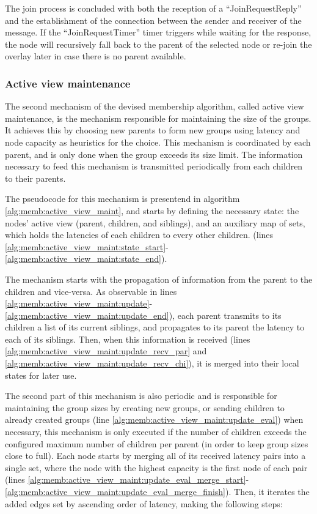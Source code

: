The join process is concluded with both the reception of a ``JoinRequestReply'' and the establishment of the connection between the sender and receiver of the message. If the ``JoinRequestTimer'' timer triggers while waiting for the response, the node will recursively fall back to the parent of the selected node or re-join the overlay later in case there is no parent available. 

\subsubsection{Active view maintenance}

The second mechanism of the devised membership algorithm, called active view maintenance, is the mechanism responsible for maintaining the size of the groups. It achieves this by choosing new parents to form new groups using latency and node capacity as heuristics for the choice. This mechanism is coordinated by each parent, and is only done when the group exceeds its size limit. The information necessary to feed this mechanism is transmitted periodically from each children to their parents. 

The pseudocode for this mechanism is presentend in algorithm \ref{alg:memb:active_view_maint}, and starts by defining the necessary state: the nodes' active view (parent, children, and siblings), and an auxiliary map of sets, which holds the latencies of each children to every other children. (lines \ref{alg:memb:active_view_maint:state_start}-\ref{alg:memb:active_view_maint:state_end}). 

The mechanism starts with the propagation of information from the parent to the children and vice-versa. As observable in lines \ref{alg:memb:active_view_maint:update}-\ref{alg:memb:active_view_maint:update_end}), each parent transmits to its children a list of its current siblings, and propagates to its parent the latency to each of its siblings. Then, when this information is received (lines \ref{alg:memb:active_view_maint:update_recv_par} and \ref{alg:memb:active_view_maint:update_recv_chi}), it is merged into their local states for later use.

The second part of this mechanism is also periodic and is responsible for maintaining the group sizes by creating new groups, or sending children to already created groups (line \ref{alg:memb:active_view_maint:update_eval}) when necessary, this mechanism is only executed if the number of children exceeds the configured maximum number of children per parent (in order to keep group sizes close to full). Each node starts by merging all of its received latency pairs into a single set, where the node with the highest capacity is the first node of each pair (lines \ref{alg:memb:active_view_maint:update_eval_merge_start}-\ref{alg:memb:active_view_maint:update_eval_merge_finish}). Then, it iterates the added edges set by ascending order of latency, making the following steps:

